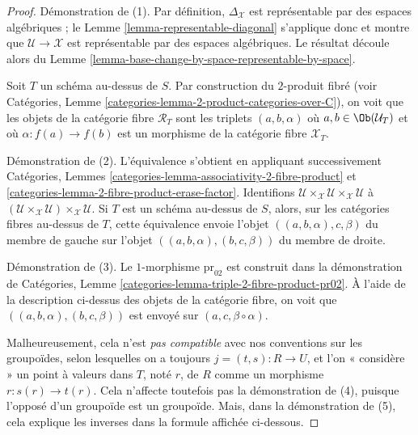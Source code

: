 \begin{proof}
Démonstration de (1). Par définition, $\Delta_\mathcal{X}$ est représentable
par des espaces algébriques ; le
Lemme \ref{lemma-representable-diagonal}
s'applique donc et montre que $\mathcal{U} \to \mathcal{X}$ est représentable
par des espaces algébriques. Le résultat découle alors du
Lemme \ref{lemma-base-change-by-space-representable-by-space}.

\medskip\noindent
Soit $T$ un schéma au-dessus de $S$. Par construction du $2$-produit fibré (voir
Catégories, Lemme \ref{categories-lemma-2-product-categories-over-C}),
on voit que les objets de la catégorie fibre $\mathcal{R}_T$
sont les triplets $(a, b, \alpha)$ où $a, b \in \Ob(\mathcal{U}_T)$
et où $\alpha : f(a) \to f(b)$
est un morphisme de la catégorie fibre $\mathcal{X}_T$.

\medskip\noindent
Démonstration de (2). L'équivalence s'obtient en appliquant successivement
Catégories, Lemmes \ref{categories-lemma-associativity-2-fibre-product} et
\ref{categories-lemma-2-fibre-product-erase-factor}.
Identifions
$\mathcal{U} \times_\mathcal{X} \mathcal{U} \times_\mathcal{X} \mathcal{U}$
à
$(\mathcal{U} \times_\mathcal{X} \mathcal{U})
\times_\mathcal{X} \mathcal{U}$.
Si $T$ est un schéma au-dessus de $S$, alors, sur les catégories fibres au-dessus de $T$,
cette équivalence envoie l'objet
$((a, b, \alpha), c, \beta)$ du membre de gauche
sur l'objet $((a, b, \alpha), (b, c, \beta))$ du membre de droite.

\medskip\noindent
Démonstration de (3). Le $1$-morphisme $\text{pr}_{02}$ est construit dans la démonstration de
Catégories, Lemme \ref{categories-lemma-triple-2-fibre-product-pr02}.
À l'aide de la description ci-dessus des objets de la catégorie fibre,
on voit que $((a, b, \alpha), (b, c, \beta))$
est envoyé sur $(a, c, \beta \circ \alpha)$.

\medskip\noindent
Malheureusement, cela n'est {\it pas compatible} avec nos conventions sur les
groupoïdes, selon lesquelles on a toujours $j = (t, s) : R \to U$, et l'on « considère »
un point à valeurs dans $T$, noté $r$, de $R$ comme un morphisme $r : s(r) \to t(r)$.
Cela n'affecte toutefois pas la démonstration de (4), puisque l'opposé d'un
groupoïde est un groupoïde. Mais, dans la démonstration de (5), cela explique
les inverses dans la formule affichée ci-dessous.


\end{proof}
